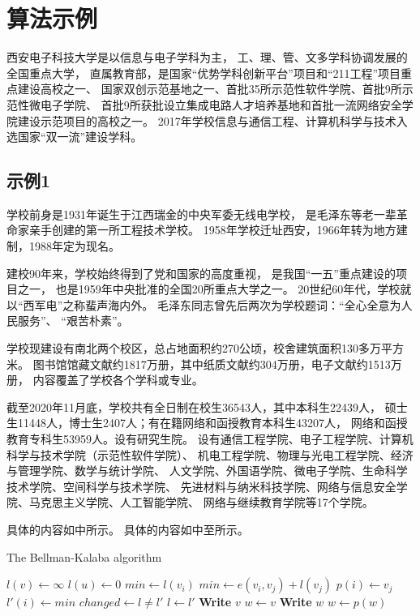\chapter{算法示例}
西安电子科技大学是以信息与电子学科为主，
工、理、管、文多学科协调发展的全国重点大学，
直属教育部，是国家“优势学科创新平台”项目和“211工程”项目重点建设高校之一、
国家双创示范基地之一、首批35所示范性软件学院、首批9所示范性微电子学院、
首批9所获批设立集成电路人才培养基地和首批一流网络安全学院建设示范项目的高校之一。
2017年学校信息与通信工程、计算机科学与技术入选国家“双一流”建设学科。
\section{示例1}
学校前身是1931年诞生于江西瑞金的中央军委无线电学校，
是毛泽东等老一辈革命家亲手创建的第一所工程技术学校。
1958年学校迁址西安，1966年转为地方建制，1988年定为现名。
\par
建校90年来，学校始终得到了党和国家的高度重视，
是我国“一五”重点建设的项目之一，
也是1959年中央批准的全国20所重点大学之一。
20世纪60年代，学校就以“西军电”之称蜚声海内外。
毛泽东同志曾先后两次为学校题词：“全心全意为人民服务”、
“艰苦朴素”。
\par
学校现建设有南北两个校区，总占地面积约270公顷，校舍建筑面积130多万平方米。
图书馆馆藏文献约1817万册，其中纸质文献约304万册，电子文献约1513万册，
内容覆盖了学校各个学科或专业。
\par
截至2020年11月底，学校共有全日制在校生36543人，其中本科生22439人，
硕士生11448人，博士生2407人；有在籍网络和函授教育本科生43207人，
网络和函授教育专科生53959人。设有研究生院。
设有通信工程学院、电子工程学院、计算机科学与技术学院（示范性软件学院）、
机电工程学院、物理与光电工程学院、经济与管理学院、数学与统计学院、
人文学院、外国语学院、微电子学院、生命科学技术学院、空间科学与技术学院、
先进材料与纳米科技学院、网络与信息安全学院、马克思主义学院、人工智能学院、
网络与继续教育学院等17个学院。
\par
具体的内容如中所示。
具体的内容如中至所示。
\begin{algorithm}
\caption{The Bellman-Kalaba algorithm}
\label{alg1}
\begin{algorithmic}[1]
\State $l(v) \leftarrow \infty$\label{line1}
\EndFor
\State $l(u) \leftarrow 0$
\Repeat
{}
\State $min \leftarrow l(v_i)$
\label{line2}
\State $min \leftarrow e(v_i, v_j) + l(v_j)$
\State $p(i) \leftarrow v_j$
\EndIf
\EndFor\label{line3}
\State $l'(i) \leftarrow min$
\EndFor
\State $changed \leftarrow l \not= l'$
\State $l \leftarrow l'$
\EndProcedure
\Statex
{}
\State \textbf{Write} $v$
\Else
\State $w \leftarrow v$
\State \textbf{Write} $w$
\State $w \leftarrow p(w)$
\EndWhile
\EndIf
\EndProcedure
\end{algorithmic}
\end{algorithm}

